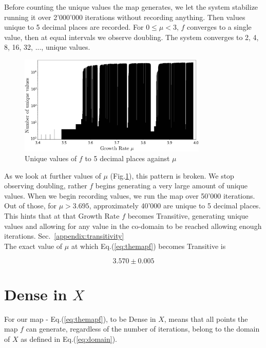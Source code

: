 Before counting the unique values the map generates, we let the system stabilize
running it over 2'000'000 iterations without recording anything. Then values unique to 
5 decimal places are recorded. For $0\leq \mu < 3$, $f$ converges to a single value,
then at equal intervals we observe doubling. The system converges to 2, 4, 8, 16, 32, ...,
unique values.

\begin{figure}[h]
    \centering
    \includegraphics[width=0.8\textwidth]{Images/Untitled.png}
    \caption{Unique values of $f$ to 5 decimal places against $\mu$}
    \label{fig:trans2}
\end{figure}

As we look at further values of $\mu$ (Fig.\ref{fig:trans2}), this pattern is broken.
We stop observing doubling, rather $f$ begins generating a very large amount of unique
values. When we begin recording values, we run the map over 50'000 iterations.
Out of those, for $\mu > 3.695$, approximately 40'000 are unique to 5 decimal places.
This hints that at that Growth Rate $f$ becomes Transitive, generating unique values 
and allowing for any value in the co-domain to be reached allowing enough iterations. Sec.~\ref{appendix:transitivity}\\
The exact value of $\mu$ at which Eq.(\ref{eq:themapf}) becomes Transitive is

\begin{equation}
    3.570 \pm 0.005
\end{equation}


\newpage
\section{Dense in $X$}
For our map - Eq.(\ref{eq:themapf}), to be Dense in $X$, means that all points
the map $f$ can generate, regardless of the number of iterations, belong to
the domain of $X$ as defined in Eq.(\ref{eq:domain}).


